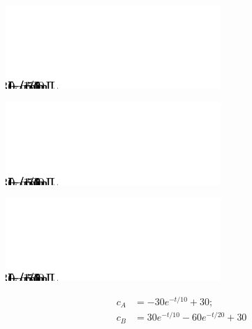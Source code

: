 \newpage
\hfill \includegraphics[width=0.5\linewidth]{graphics/notes_09_tanks1}

\newpage
\hfill \includegraphics[width=0.5\linewidth]{graphics/notes_09_tanks1}

\newpage
\hfill 
\includegraphics[width=0.3\linewidth]{graphics/notes_09_tanks1}

\begin{align*}
  c_A & = -30 e^{-t/10} + 30; \\
c_B & = 30 e^{-t/10} - 60 e^{-t/20} + 30
\end{align*}

\begin{center}
\end{center}



